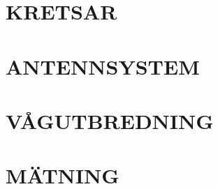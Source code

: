 \documentclass[a4paper,twoside,openright]{book}
\begin{document}
\chapter{KRETSAR}












%
%
%
%
%
%
%
%
%

%
%

\chapter{ANTENNSYSTEM}







\chapter{VÅGUTBREDNING}
\label{vågutbredning}







\chapter{MÄTNING}



%
%
%
%
\end{document}
